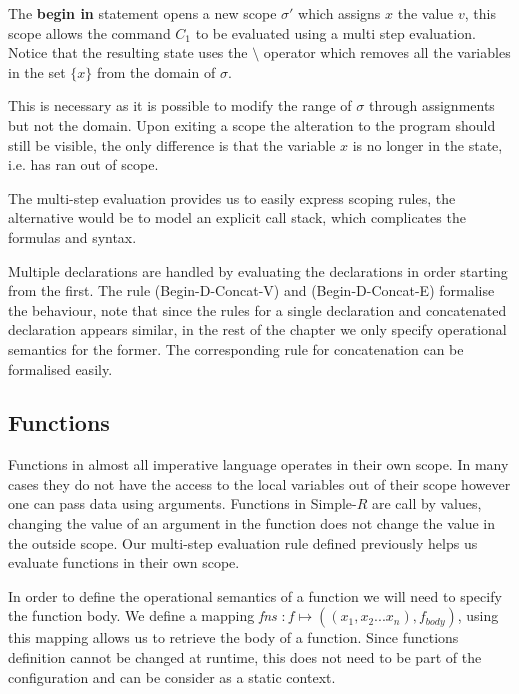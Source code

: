 \documentclass[a4paper,12pt]{report}
\begin{document}
\par
The \textbf{begin in} statement opens a new scope $\sigma'$ which 
assigns $x$ the value $v$, this scope allows the command $C_1$ to be evaluated 
using a multi step evaluation. Notice that the resulting state 
uses the $\setminus$ operator which removes all the variables 
in the set $\{x\}$ from the domain of $\sigma$. 

\par
This is necessary as it is possible to modify the range of $\sigma$ through 
assignments but not the domain. Upon exiting a scope the alteration to the program 
should still be visible, the only difference is that the variable $x$ is no longer in 
the state, i.e. has ran out of scope.

\par
The multi-step evaluation provides us to easily express scoping rules, 
the alternative would be to model an explicit call stack, which complicates the 
formulas and syntax.

\par
Multiple declarations are handled by evaluating the declarations in order 
starting from the first. The rule (Begin-D-Concat-V) and (Begin-D-Concat-E) 
formalise the behaviour, note that since the rules for a single declaration and 
concatenated declaration appears similar, in the rest of the chapter we only 
specify operational semantics for the former. The corresponding rule for 
concatenation can be formalised easily. 

\subsection{Functions} \label{section:functions_sos}
Functions in almost all imperative language operates in their own scope. In many 
cases they do not have the access to the local variables out of their scope however 
one can pass data using arguments. Functions in Simple-$R$ are call by values, 
changing the value of an argument in the function does not change the value in 
the outside scope. Our multi-step evaluation rule defined previously helps us 
evaluate functions in their own scope. 

\par
In order to define the operational semantics of a function we will need to 
specify the function body. We define a mapping 
\textit{fns} $: f \mapsto ((x_1, x_2...x_n), f_{body})$, 
using this mapping allows us to retrieve the body of a function. Since functions 
definition cannot be changed at runtime, this does not need to be part of the 
configuration and can be consider as a static context.
\end{document}
